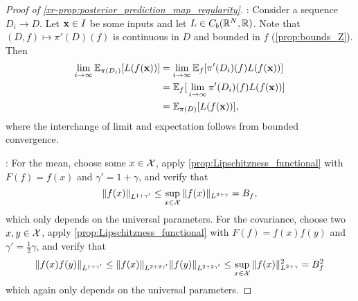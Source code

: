 \documentclass[12pt]{report}
\newcommand{\xrprefix}[1]{xr-#1}
\begin{document}
\begin{proof}[Proof of \ref{\xrprefix{prop:posterior_prediction_map_regularity}}]
    :
    Consider a sequence $D_i \to D$.
    Let $\mathbf{x} \in I$ be some inputs and let $L \in C_b(\mathbb{R}^{N}, \mathbb{R})$.
    Note that $(D, f) \mapsto \pi'(D)(f)$ is continuous in $D$ and bounded in $f$ (\cref{prop:bounds_Z}).
    Then
    \begin{align}
        \lim_{i \to \infty} \mathbb{E}_{\pi(D_i)}[L(f(\mathbf{x}))]
        &= \lim_{i \to \infty} \mathbb{E}_{f}[\pi'(D_i)(f) L(f(\mathbf{x}))] \\
        &= \mathbb{E}_{f}[\,\lim_{i \to \infty} \pi'(D_i)(f) L(f(\mathbf{x}))] \\
        &= \mathbb{E}_{\pi(D)}[L(f(\mathbf{x}))],
    \end{align}
    where the interchange of limit and expectation follows from bounded convergence.

    :
    For the mean, choose some $x \in \mathcal{X}$, apply \cref{prop:Lipschitzness_functional} with $F(f) = f(x)$ and $\gamma' = 1 + \gamma$, and verify that
    \begin{equation}
        \lVert f(x)\rVert_{L^{1 + \gamma'}}
        \le \operatorname*{sup}_{x \in \mathcal{X}} \, \lVert f(x)\rVert_{L^{2 + \gamma}}
        = B_f,
    \end{equation}
    which only depends on the universal parameters.
    For the covariance, choose two $x, y \in \mathcal{X}$, apply \cref{prop:Lipschitzness_functional} with $F(f) = f(x)f(y)$ and $\gamma' = \frac12 \gamma$, and verify that 
    \begin{equation}
        \lVert f(x) f(y)\rVert_{L^{1 + \gamma'}}
        \le
            \lVert f(x)\rVert_{L^{2 + 2\gamma'}}
            \lVert f(y)\rVert_{L^{2 + 2\gamma'}}
        \le \operatorname*{sup}_{x \in \mathcal{X}}\, \lVert f(x)\rVert^2_{L^{2 + \gamma}}
        = B^2_f
    \end{equation}
    which again only depends on the universal parameters.
    

\end{proof}
\end{document}
